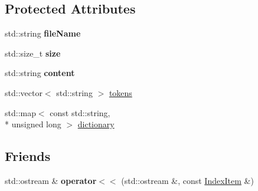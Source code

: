 \subsection*{Protected Attributes}
\begin{DoxyCompactItemize}
\item 
\hypertarget{classIndexItem_a67e954645b9cd94b033c09dc9734b5ea}{std\-::string {\bfseries file\-Name}}\label{classIndexItem_a67e954645b9cd94b033c09dc9734b5ea}

\item 
\hypertarget{classIndexItem_a259507ae46a62a2411a102b17b731c1f}{std\-::size\-\_\-t {\bfseries size}}\label{classIndexItem_a259507ae46a62a2411a102b17b731c1f}

\item 
\hypertarget{classIndexItem_a0ff78840db32dd97333a49d69e62ffe6}{std\-::string {\bfseries content}}\label{classIndexItem_a0ff78840db32dd97333a49d69e62ffe6}

\item 
std\-::vector$<$ std\-::string $>$ \hyperlink{classIndexItem_a36ee76ec7176493ed48952d6231c29f2}{tokens}
\item 
std\-::map$<$ const std\-::string, \\*
unsigned long $>$ \hyperlink{classIndexItem_a667ce7eb5e6f22b032dcacd042d89cd3}{dictionary}
\end{DoxyCompactItemize}
\subsection*{Friends}
\begin{DoxyCompactItemize}
\item 
\hypertarget{classIndexItem_acb212461465a08ba81c6b0f35e1151a2}{std\-::ostream \& {\bfseries operator$<$$<$} (std\-::ostream \&, const \hyperlink{classIndexItem}{Index\-Item} \&)}\label{classIndexItem_acb212461465a08ba81c6b0f35e1151a2}

\end{DoxyCompactItemize}


